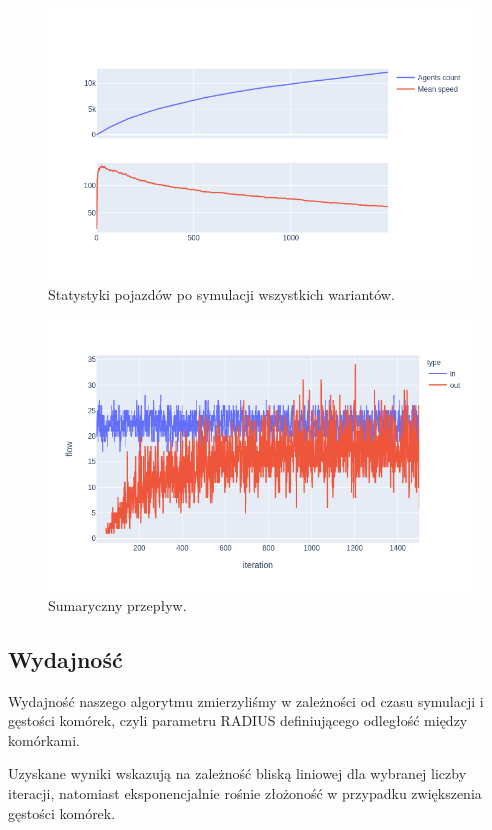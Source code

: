 \documentclass[a4paper,12pt]{article}
\begin{document}
    \begin{figure}[H]
    	\centering
    	\includegraphics[width=\linewidth]{img/note-agents.png}
    	\caption{Statystyki pojazdów po symulacji wszystkich wariantów.}
    \end{figure}

	\begin{figure}[H]
		\centering
		\includegraphics[width=\linewidth]{img/note-inout.png}
		\caption{Sumaryczny przepływ.}
	\end{figure}
    
    \subsection{Wydajność}
    Wydajność naszego algorytmu zmierzyliśmy w zależności od czasu symulacji i gęstości komórek, czyli parametru RADIUS definiującego odległość między komórkami.
    
    Uzyskane wyniki wskazują na zależność bliską liniowej dla wybranej liczby iteracji, natomiast eksponencjalnie rośnie złożoność w przypadku zwiększenia gęstości komórek.
    
\end{document}
